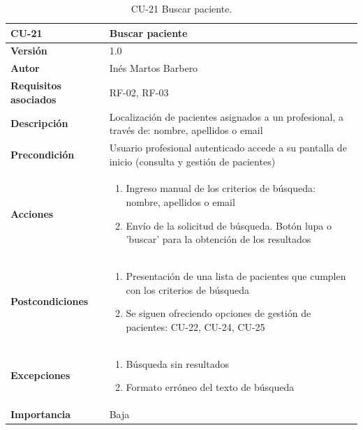 \begin{table}[p]
	\centering
	\begin{tabularx}{\linewidth}{ p{} p{} }
		\toprule
		\textbf{CU-21}    & \textbf{Buscar paciente}\\
		\toprule
		\textbf{Versión}              & 1.0    \\
		\textbf{Autor}                & Inés Martos Barbero \\
		\textbf{Requisitos asociados} & RF-02, RF-03 \\
		\textbf{Descripción}          & Localización de pacientes asignados a un profesional, a través de: nombre, apellidos o email \\
		\textbf{Precondición}         & Usuario profesional autenticado accede a su pantalla de inicio (consulta y gestión de pacientes) \\
		\textbf{Acciones}             &
		\begin{enumerate}
			\def\labelenumi{\arabic{enumi}.}
			\tightlist
			\item Ingreso manual de los criterios de búsqueda: nombre, apellidos o email
			\item Envío de la solicitud de búsqueda. Botón lupa o 'buscar' para la obtención de los resultados
		\end{enumerate}\\
		\textbf{Postcondiciones}        & 
        \begin{enumerate}
			\def\labelenumi{\arabic{enumi}.}
			\tightlist
			\item Presentación de una lista de pacientes que cumplen con los criterios de búsqueda
			\item Se siguen ofreciendo opciones de gestión de pacientes: CU-22, CU-24, CU-25
		\end{enumerate}\\
		\textbf{Excepciones}          & 
        \begin{enumerate}
			\def\labelenumi{\arabic{enumi}.}
			\tightlist
			\item Búsqueda sin resultados
			\item Formato erróneo del texto de búsqueda
		\end{enumerate}\\
		\textbf{Importancia}          & Baja \\
		\bottomrule
	\end{tabularx}
	\caption{CU-21 Buscar paciente.}
\end{table}

